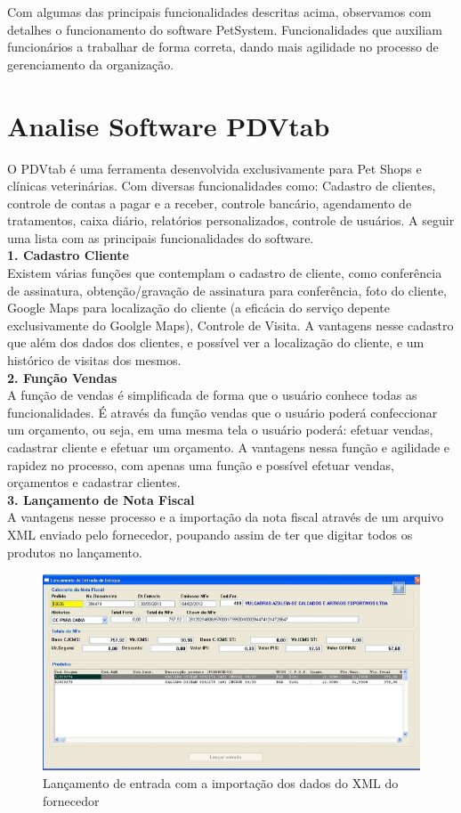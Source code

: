 \documentclass[12pt,openright,twoside,a4paper,english,french,spanish,brazil]{abntex2}
\begin{document}
Com algumas das principais funcionalidades descritas acima, observamos com detalhes o funcionamento do software PetSystem. Funcionalidades que auxiliam funcionários a trabalhar de forma correta, dando mais agilidade no processo de gerenciamento da organização.


\section*{Analise Software PDVtab}
O PDVtab é uma ferramenta desenvolvida exclusivamente para Pet Shops e clínicas veterinárias. Com diversas funcionalidades como: Cadastro de clientes, controle de contas a pagar e a receber, controle bancário, agendamento de tratamentos, caixa diário, relatórios personalizados, controle de usuários. A seguir uma lista com as principais funcionalidades do software.\\
\textbf{1.	{Cadastro Cliente}}\\
Existem várias funções que contemplam o cadastro de cliente, como conferência de assinatura, obtenção/gravação de assinatura para conferência, foto do cliente, Google Maps para localização do cliente (a eficácia do serviço depente exclusivamente do Goolgle Maps), Controle de Visita. A vantagens nesse cadastro que além dos dados dos clientes, e possível ver a localização do cliente, e um histórico de visitas dos mesmos.\\
\textbf{2.	{Função Vendas}}\\
A função de vendas é simplificada de forma que o usuário conhece todas as funcionalidades. É através da função vendas que o usuário poderá confeccionar um orçamento, ou seja, em uma mesma tela o usuário poderá: efetuar vendas, cadastrar cliente e efetuar um orçamento. A vantagens nessa função e agilidade e rapidez no processo, com apenas uma função e possível efetuar vendas, orçamentos e cadastrar clientes.\\
\textbf{3.	{Lançamento de Nota Fiscal}}\\
A vantagens nesse processo e a importação da nota fiscal através de um arquivo XML enviado pelo fornecedor, poupando assim de ter que digitar todos os produtos no lançamento.\\

\begin{figure}[htb!]
\includegraphics[scale=0.5]{nota_fiscal} 
\centering
\caption{Lançamento de entrada com a importação dos dados do XML do fornecedor}
\label{img_nota_fiscal}
\end{figure}
\end{document}
